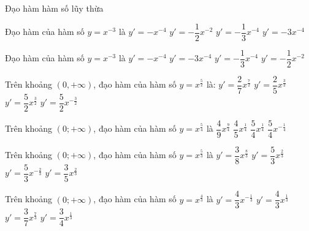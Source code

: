 \begin{dang}
	{Đạo hàm hàm số lũy thừa}
\end{dang}
\begin{ex}%
	[Mã 101 - 2022]
	Đạo hàm của hàm số $y=x^{-3}$ là 
	\choice
	{$y'=-x^{-4}$}
	{$y'=-\dfrac{1}{2}{x^{-2}}$}
	{$y'=-\dfrac{1}{3}{x^{-4}}$}
	{\True $y'=-3x^{-4}$}
\end{ex}
\begin{ex}%
	[Mã 102 - 2022]
	Đạo hàm của hàm số $ y=x^{-3}$ là
	\choice
	{$y'=-x^{-4}$}
	{\True $y'=-3x^{-4}$}
	{$y'=-\dfrac{1}{3}{x^{-4}}$}
	{$y'=-\dfrac{1}{2}{x^{-2}}$}
\end{ex}
\begin{ex}%
	[Mã 101 - 2021 Lần 1]
	Trên khoảng $\left(0,+\infty\right)$, đạo hàm của hàm số $y=x^{\frac{5}{2}}$ là:
	\choice
	{$y'=\dfrac{2}{7}{x^{\frac{7}{2}}}$}
	{$y'=\dfrac{2}{5}{x^{\frac{3}{2}}}$}
	{\True $y'=\dfrac{5}{2}{x^{\frac{3}{2}}}$}
	{$y'=\dfrac{5}{2}{x^{-\frac{3}{2}}}$}
\end{ex}
\begin{ex}%
	[Mã 102 - 2021 Lần 1]
	Trên khoảng $\left(0;+\infty\right)$, đạo hàm của hàm số $y=x^{\frac{5}{4}}$ là
	\choice
	{$\dfrac{4}{9}{x^{\frac{9}{4}}}$}
	{$\dfrac{4}{5}{x^{\frac{1}{4}}}$}
	{\True $\dfrac{5}{4}{x^{\frac{1}{4}}}$}
	{$\dfrac{5}{4}{x^{-\frac{1}{4}}}$}
\end{ex}
\begin{ex}%
	[Mã 104 - 2021 Lần 1]
	Trên khoảng $\left(0;+\infty\right)$, đạo hàm của hàm số $y=x^{\frac{5}{3}}$ là
	\choice
	{$y'=\dfrac{3}{8}{x^{\frac{8}{3}}}$}
	{\True $y'=\dfrac{5}{3}{x^{\frac{2}{3}}}$}
	{$y'=\dfrac{5}{3}{x^{-\frac{2}{3}}}$}
	{$y'=\dfrac{3}{5}{x^{\frac{2}{3}}}$}
\end{ex}
\begin{ex}%
	[Mã 103 - 2021-Lần 1]
	Trên khoảng $\left(0;+\infty\right)$, đạo hàm của hàm số $y=x^{\frac{4}{3}}$ là
	\choice
	{$y'=\dfrac{4}{3}{x^{-\frac{1}{3}}}$}
	{\True $y'=\dfrac{4}{3}{x^{\frac{1}{3}}}$}
	{$y'=\dfrac{3}{7}{x^{\frac{7}{3}}}$}
	{$y'=\dfrac{3}{4}{x^{\frac{1}{3}}}$}
\end{ex}

